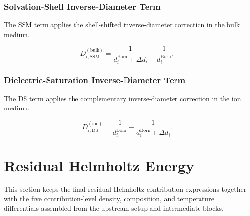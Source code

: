 \documentclass[12pt, letterpaper]{article}
\begin{document}
\subsubsection{Solvation-Shell Inverse-Diameter Term}

The SSM term applies the shell-shifted inverse-diameter correction in the bulk medium.

\begin{equation}
D_{i,\mathrm{SSM}}^{(\mathrm{bulk})}
=
\frac{1}{d_i^{\mathrm{Born}}+\Delta d_i}
-
\frac{1}{d_i^{\mathrm{Born}}},
\label{eq:D_ssm}
\end{equation}

\subsubsection{Dielectric-Saturation Inverse-Diameter Term}

The DS term applies the complementary inverse-diameter correction in the ion medium.

\begin{equation}
D_{i,\mathrm{DS}}^{(\mathrm{ion})}
=
\frac{1}{d_i^{\mathrm{Born}}}
-
\frac{1}{d_i^{\mathrm{Born}}+\Delta d_i}.
\label{eq:D_ds}
\end{equation}

\section{Residual Helmholtz Energy}
\label{sec:ares}

This section keeps the final residual Helmholtz contribution expressions together with the five contribution-level density, composition, and temperature differentials assembled from the upstream setup and intermediate blocks.
\end{document}
